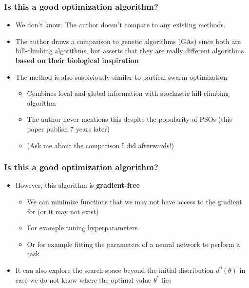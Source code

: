 \documentclass{beamer}
\begin{document}
\begin{frame}
\frametitle{Is this a good optimization algorithm?}
\begin{itemize}
  \item<2-> We don't know. The author doesn't compare to any existing methods.
  \item<3-> The author draws a comparison to genetic algorithms (GAs) since both are hill-climbing algorithms, but asserts that they are really different algorithms \textbf{based on their biological inspiration}
  \item<4-> The method is also suspiciously similar to partical swarm optimization
  \begin{itemize}
    \item<5-> Combines local and global information with stochastic hill-climbing algorithm
    \item<5-> The author never mentions this despite the popularity of PSOs (this paper publish 7 years later)
    \item<6-> (Ask me about the comparison I did afterwards!)
  \end{itemize}
\end{itemize}
\end{frame}

\begin{frame}
\frametitle{Is this a good optimization algorithm?}
\begin{itemize}
  \item<1-> However, this algorithm is \textbf{gradient-free}
  \begin{itemize}
    \item<2-> We can minimize functions that we may not have access to the gradient for (or it may not exist)
    \item<2-> For example tuning hyperparameters
    \item<2-> Or for example fitting the parameters of a neural network to perform a task
  \end{itemize}
  \item<3-> It can also explore the search space beyond the initial distribution $d^0(\theta)$ in case we do not know where the optimal value $\theta^*$ lies
\end{itemize}
\end{frame}
\end{document}
